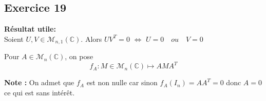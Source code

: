 \documentclass[a4paper,12pt]{article}
\begin{document}
    \subsection*{Exercice 19}

        \begin{correctionbox}
        \textbf{Résultat utile:} \\
        Soient \(U,V \in \mathcal{M}_{n,1}(\mathbb{C})\). Alors \(UV^T = 0\) $\Leftrightarrow$ \(U= 0 \quad ou \quad V=0\)
        \end{correctionbox}
        
        Pour \( A \in \mathcal{M}_n(\mathbb{C}) \), on pose
        \[
        f_A : M \in \mathcal{M}_n(\mathbb{C}) \mapsto AMA^T
        \]

        \textbf{Note :} On admet que \(f_A\) est non nulle car sinon \(f_A(I_n) = AA^T = 0\) donc \(A=0\) ce qui est sans intérêt.
        
\end{document}
